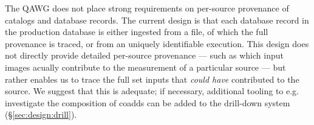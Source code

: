 The QAWG does not place strong requirements on per-source provenance of catalogs and database records.
The current design is that each database record in the production database is either ingested from a file, of which the full provenance is traced, or from an uniquely identifiable execution.
This design does not directly provide detailed per-source provenance --- such as which input images acually contribute to the measurement of a particular source --- but rather enables us to trace the full set inputs that \textit{could have} contributed to the source.
We suggest that this is adequate; if necessary, additional tooling to e.g. investigate the composition of coadds can be added to the drill-down system (\S\ref{sec:design:drill}).
